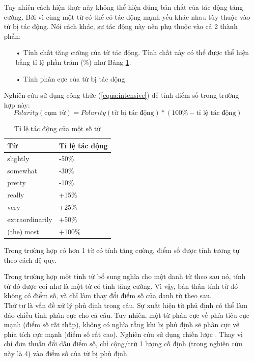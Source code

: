 Tuy nhiên cách hiện thực này không thể hiện đúng bản chất của tác động tăng cường. Bởi vì cùng một từ  có thể có tác động mạnh yếu khác nhau tùy thuộc vào từ bị tác động. Nói cách khác, sự tác động này nên phụ thuộc vào cả 2 thành phần: 
\begin{itemize}
\item[•] Tính chất tăng cường của từ tác động. Tính chất này có thể được thể hiện bằng tỉ lệ phần trăm (\%) như Bảng \ref{table:intensive}.
\item[•] Tính phân cực của từ bị tác động
\end{itemize}
Nghiên cứu \cite{taboada2011lexicon} sử dụng công thức (\ref{equa:intensive}) để tính điểm số trong trường hợp này:
\begin{equation}
\label{equa:intensive}
Polarity (\text{cụm từ}) = Polarity(\text{từ bị tác động}) * (100\% - \text{tỉ lệ tác động})
\end{equation}
\begin{table}[H]
\centering
\caption{Tỉ lệ tác động của một số từ} \label{table:intensive}
\begin{tabular}{l l}
\hline
\textbf{Từ} & \textbf{Tỉ lệ tác động} 
\\ \hline
slightly & -50\%
\\ 
somewhat & -30\%
\\ 
pretty & -10\%
\\ 
really & +15\%
\\ 
very & +25\%
\\ 
extraordinarily & +50\%
\\
(the) most & +100\%
\\ \hline
\end{tabular}
\end{table}
Trong trường hợp có hơn 1 từ có tính tăng cường, điểm số được tính tương tự theo cách đệ quy. \\

Trong trường hợp một tính từ bổ sung nghĩa cho một danh từ theo sau nó, tính từ đó được coi như là một từ có tính tăng cường. Vì vậy, bản thân tính từ đó không có điểm số, và chỉ làm thay đổi điểm số của danh từ theo sau. \\
Thứ tư là vấn đề xử lý phủ định trong câu. Sự xuất hiện từ phủ định có thể làm đảo chiều tính phân cực cho cả câu. Tuy nhiên, một từ phân cực về phía tiêu cực mạnh (điểm số rất thấp), không có nghĩa rằng khi bị phủ định sẽ phân cực về phía tích cực mạnh (điểm số rất cao). Nghiên cứu \cite{taboada2011lexicon} sử dụng chiến lược . Thay vì chỉ đơn thuần đổi dấu điểm số,  chỉ cộng/trừ 1 lượng cố định (trong nghiên cứu này là 4) vào điểm số của từ bị phủ định.\\


